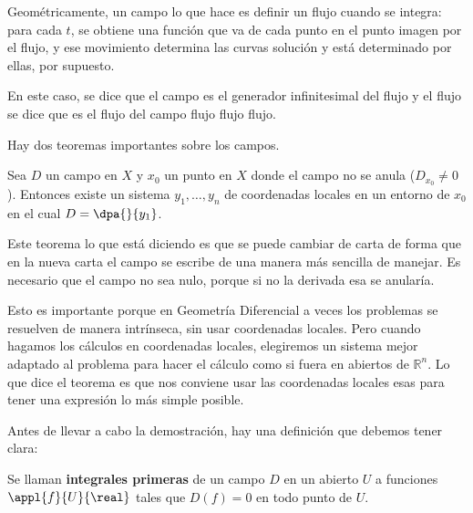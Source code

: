 Geométricamente, un campo lo que hace es definir un flujo cuando se integra: para cada $t$, se obtiene una función que va de cada punto en el punto imagen por el flujo, y ese movimiento determina las curvas solución y está determinado por ellas, por supuesto.

En este caso, se dice que el campo es el generador infinitesimal del flujo y el flujo se dice que es el flujo del campo flujo flujo flujo.

Hay dos teoremas importantes sobre los campos.

\begin{theorem} Sea $D$ un campo en $X$ y $x_0$ un punto en $X$ donde el campo no se anula ($D_{x_0} ≠ 0$). Entonces existe un sistema $y_1, \dotsc, y_n$ de coordenadas locales en un entorno de $x_0$ en el cual $D = \dpa{}{y_1}$. \label{thm:EnderezamientoCampos}
\end{theorem}

Este teorema lo que está diciendo es que se puede cambiar de carta de forma que en la nueva carta el campo se escribe de una manera más sencilla de manejar. Es necesario que el campo no sea nulo, porque si no la derivada esa se anularía.

Esto es importante porque en Geometría Diferencial a veces los problemas se resuelven de manera intrínseca, sin usar coordenadas locales. Pero cuando hagamos los cálculos en coordenadas locales, elegiremos un sistema mejor adaptado al problema para hacer el cálculo como si fuera en abiertos de $ℝ^n$. Lo que dice el teorema es que nos conviene usar las coordenadas locales esas para tener una expresión lo más simple posible.

Antes de llevar a cabo la demostración, hay una definición que debemos tener clara:

\begin{defn} Se llaman \textbf{integrales primeras} de un campo $D$ en un abierto $U$ a funciones $\appl{f}{U}{\real}$ tales que $D(f)=0$ en todo punto de $U$.
\end{defn}

